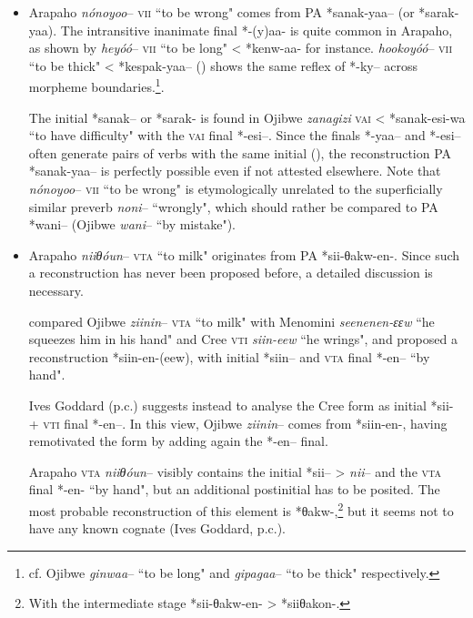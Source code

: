 \documentclass[oldfontcommands,oneside,a4paper,11pt]{article}
\begin{document}
\begin{itemize}


\item Arapaho \textit{nónoyoo}-- \textsc{vii} ``to be wrong" comes from PA *sanak-yaa-- (or *sarak-yaa). The intransitive inanimate final *-(y)aa- is quite common in Arapaho, as shown by  \textit{heyóó}-- \textsc{vii} ``to be long" < *kenw-aa- for instance.   \textit{hookoyóó}-- \textsc{vii} ``to be thick" < *kespak-yaa-- (\citealt[140]{goddard74arapaho}) shows the same reflex of *-ky-- across morpheme boundaries.\footnote{cf. Ojibwe \textit{ginwaa}-- ``to be long" and \textit{gipagaa}-- ``to be thick" respectively.}.

The initial *sanak-- or *sarak- is found in Ojibwe \textit{zanagizi} \textsc{vai} < *sanak-esi-wa ``to have difficulty" with the \textsc{vai} final *-esi--. Since the finals *-yaa-- and *-esi-- often generate pairs of verbs with the same initial (\citealt{bloomfield46proto}), the reconstruction PA *sanak-yaa-- is perfectly possible even if not attested elsewhere. Note that \textit{nónoyoo}-- \textsc{vii} ``to be wrong" is etymologically unrelated to the superficially similar preverb \textit{noni}-- ``wrongly", which should rather be compared to PA *wani-- (Ojibwe \textit{wani}-- ``by mistake").


 \item Arapaho \textit{niiθóun}-- \textsc{vta} ``to milk" originates from PA *sii-θakw-en-. Since such a reconstruction has never been proposed before, a detailed discussion is necessary.
 
 \citet{hewson93proto} compared  Ojibwe \textit{ziinin}-- \textsc{vta} ``to milk" with Menomini \textit{seenenen-ɛɛw} ``he squeezes him in his hand" and Cree \textsc{vti} \textit{siin-eew} ``he wrings", and proposed a reconstruction *siin-en-(eew), with initial *siin-- and \textsc{vta} final *-en-- ``by hand". 
 
 Ives Goddard (p.c.) suggests instead to analyse the Cree form as initial *sii- + \textsc{vti} final *-en--.  In this view, Ojibwe \textit{ziinin}-- comes from *siin-en-, having remotivated the form by adding again the *-en-- final. 
 
 Arapaho \textsc{vta} \textit{niiθóun}-- visibly contains the initial *sii-- > \textit{nii}-- and the \textsc{vta} final *-en- ``by hand", but an additional postinitial has to be posited. The most probable reconstruction of this element is *θakw-,\footnote{With the intermediate stage *sii-θakw-en- > *siiθakon-.} but it seems not to have any known cognate (Ives Goddard, p.c.). 
 

\end{itemize}
\end{document}
